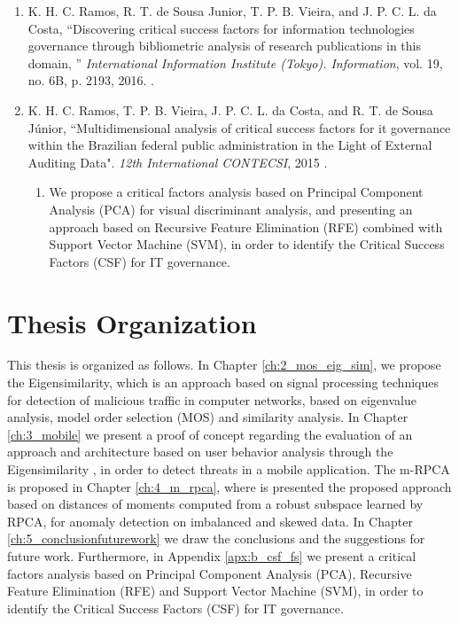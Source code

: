 \begin{enumerate}[label*=\arabic*.]
	\item K. H. C. Ramos, R. T. de Sousa Junior, T. P. B. Vieira, and J. P. C. L. da Costa, “Discovering critical success factors for information technologies governance through bibliometric analysis of research publications in this domain, ” \textit{International Information Institute (Tokyo). Information}, vol. 19, no. 6B, p. 2193, 2016. .
	\item K. H. C. Ramos, T. P. B. Vieira, J. P. C. L. da Costa, and R. T. de Sousa Júnior, “Multidimensional analysis of critical success factors for it governance within the Brazilian federal public administration in the Light of External Auditing Data". \textit{12th International CONTECSI}, 2015 .
	\begin{enumerate}[label*=\arabic*.]
		\item We propose a critical factors analysis based on Principal Component Analysis (PCA) for visual discriminant analysis, and presenting an approach based on Recursive Feature Elimination (RFE) combined with Support Vector Machine (SVM), in order to identify the Critical Success Factors (CSF) for IT governance.
	\end{enumerate}
\end{enumerate}

\section{Thesis Organization}
\label{sec:1_organization}

This thesis is organized as follows. In Chapter \ref{ch:2_mos_eig_sim}, we propose the Eigensimilarity, which is an approach based on signal processing techniques for detection of malicious traffic in computer networks, based on eigenvalue analysis, model order selection (MOS) and similarity analysis. In Chapter \ref{ch:3_mobile} we present a proof of concept regarding the evaluation of an approach and architecture based on user behavior analysis through the Eigensimilarity , in order to detect threats in a mobile application. The m-RPCA is proposed in Chapter \ref{ch:4_m_rpca}, where is presented the proposed approach based on distances of moments computed from a robust subspace learned by RPCA, for anomaly detection on imbalanced and skewed data. In Chapter \ref{ch:5_conclusionfuturework} we draw the conclusions and the suggestions for future work. Furthermore, in Appendix \ref{apx:b_csf_fs} we present a critical factors analysis based on Principal Component Analysis (PCA), Recursive Feature Elimination (RFE) and Support Vector Machine (SVM), in order to identify the Critical Success Factors (CSF) for IT governance.
